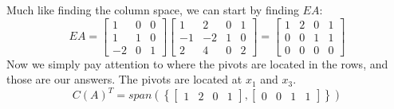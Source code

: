 \documentclass[]{exam}
\begin{document}
\begin{questions}
\begin{parts}
	\begin{solution}
		Much like finding the column space, we can start by finding $EA$:
		\[
			EA = 
			\begin{bmatrix}
				1 & 0 & 0 \\
				1 & 1 & 0 \\
				-2 & 0 & 1
			\end{bmatrix}
			\begin{bmatrix}
				1 & 2 & 0 & 1 \\
				-1 & -2 & 1 & 0 \\
				2 & 4 & 0 & 2
			\end{bmatrix} =
			\begin{bmatrix}
				1 & 2 & 0 & 1 \\
				0 & 0 & 1 & 1 \\
				0 & 0 & 0 & 0
			\end{bmatrix}
		\]
		Now we simply pay attention to where the pivots are located in the rows, and those are our answers.  The pivots are located at $x_1$ and $x_3$.
		\[
			C(A)^T = span \left(\left\{
				\begin{bmatrix}
					1 & 2 & 0 & 1
				\end{bmatrix},
				\begin{bmatrix}
					0 & 0 & 1 & 1
				\end{bmatrix}
			\right\}\right)	
		\]
	\end{solution}
\end{parts}


\end{questions}
\end{document}

